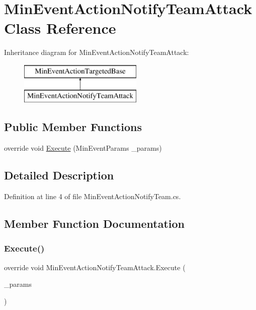 \hypertarget{class_min_event_action_notify_team_attack}{}\section{Min\+Event\+Action\+Notify\+Team\+Attack Class Reference}
\label{class_min_event_action_notify_team_attack}
Inheritance diagram for Min\+Event\+Action\+Notify\+Team\+Attack\+:\begin{figure}[H]
\begin{center}
\leavevmode
\includegraphics[height=2.000000cm]{class_min_event_action_notify_team_attack}
\end{center}
\end{figure}
\subsection*{Public Member Functions}
\begin{DoxyCompactItemize}
\item 
override void \mbox{\hyperlink{class_min_event_action_notify_team_attack_a36c05106d336c761e6aee48599156be3}{Execute}} (Min\+Event\+Params \+\_\+params)
\end{DoxyCompactItemize}


\subsection{Detailed Description}


Definition at line 4 of file Min\+Event\+Action\+Notify\+Team.\+cs.



\subsection{Member Function Documentation}
\mbox{\label{class_min_event_action_notify_team_attack_a36c05106d336c761e6aee48599156be3}} 
\subsubsection{\texorpdfstring{Execute()}{Execute()}}
{\footnotesize\ttfamily override void Min\+Event\+Action\+Notify\+Team\+Attack.\+Execute (\begin{DoxyParamCaption}\item[{Min\+Event\+Params}]{\+\_\+params }\end{DoxyParamCaption})}



